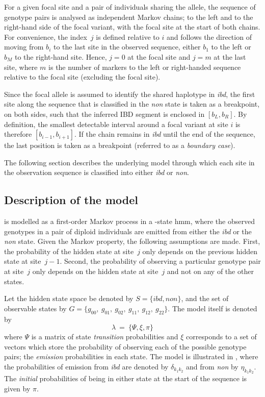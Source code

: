For a given focal site and a pair of individuals sharing the allele, the sequence of genotype pairs is analysed as  independent Markov chains; \ie {} to the left and  to the right-hand side of the focal variant, with the focal site at the start of both chains.
For convenience, the index~$j$ is defined relative to $i$ and follows the direction of moving from $b_i$ to the last site in the observed sequence, either $b_1$ to the left or $b_M$ to the right-hand site.
Hence, ${j=0}$ at the focal site and ${j = m}$ at the last site, where $m$ is the number of markers to the left or right-handed sequence relative to the focal site (excluding the focal site).

Since the focal allele is assumed to identify the shared haplotype in \emph{ibd}, the first site along the sequence that is classified in the \emph{non} state is taken as a breakpoint, on both sides, such that the inferred IBD segment is enclosed in ${[b_L, b_R]}$.
By definition, the smallest detectable interval around a focal variant at site $i$ is therefore ${[b_{i-1}, b_{i+1}]}$.
If the chain remains in \emph{ibd} until the end of the sequence, the last position is taken as a breakpoint (referred to as a \emph{boundary case}).

The following section describes the underlying model through which each site in the observation sequence is classified into either \emph{ibd} or \emph{non}.


%
\subsection{Description of the model}
%

 is modelled as a first-order Markov process in a -state \gls{hmm}, where the observed genotypes in a pair of diploid individuals are emitted from either the \emph{ibd} or the \emph{non} state.
Given the Markov property, the following assumptions are made.
First, the probability of the hidden state at site~$j$ only depends on the previous hidden state at site~${j-1}$.
Second, the probability of observing a particular genotype pair at site~$j$ only depends on the hidden state at site~$j$ and not on any of the other states.

Let the hidden state space be denoted by ${S = \lbrace \textit{ibd},\textit{non} \rbrace}$, and the set of observable states by ${G = \lbrace g_{00},~g_{01},~g_{02},~g_{11},~g_{12},~g_{22} \rbrace}$.
The model itself is denoted by
\begin{equation}\label{eq:hmm_model}
	\lambda ~=~ \lbrace \Psi, \xi, \pi \rbrace
\end{equation}
where $\Psi$ is a matrix of state \emph{transition} probabilities and $\xi$ corresponds to a set of vectors which store the probability of observing each of the possible genotype pairs; \ie the \emph{emission} probabilities in each state.
The model is illustrated in , where the probabilities of emission from \emph{ibd} are denoted by $\delta_{k_1 k_2}$ and from \emph{non} by $\eta_{k_1 k_2}$.
The \emph{initial} probabilities of being in either state at the start of the sequence is given by $\pi$.


